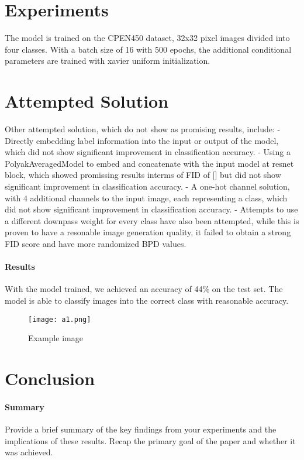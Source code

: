 \documentclass{article}
\begin{document}
\section{Experiments}
The model is trained on the CPEN450 dataset, 32x32 pixel images divided into four classes. With a batch size of 16 with 500 epochs, the additional conditional parameters are trained with xavier uniform initialization. 

\section{Attempted Solution}
Other attempted solution, which do not show as promising results, include:
- Directly embedding label information into the input or output of the model, which did not show significant improvement in classification accuracy.
- Using a PolyakAveragedModel to embed and concatenate with the input model at resnet block, which showed promissing results interms of FID of [] but did not show significant improvement in classification accuracy.
- A one-hot channel solution, with 4 additional channels to the input image, each representing a class, which did not show significant improvement in classification accuracy.
- Attempts to use a different downpass weight for every class have also been attempted, while this is proven to have a resonable image generation quality, it failed to obtain a strong FID score and have more randomized BPD values.

\paragraph{Results}
With the model trained, we achieved an accuracy of 44\% on the test set. The model is able to classify images into the correct class with reasonable accuracy.

\begin{figure}[htp]
    \centering
    \texttt{[image: a1.png]}
    \caption{Example image}
    \label{fig:exampleImage}
\end{figure}

\section{Conclusion}

\paragraph{Summary}
Provide a brief summary of the key findings from your experiments and the implications of these results. Recap the primary goal of the paper and whether it was achieved.
\end{document}

